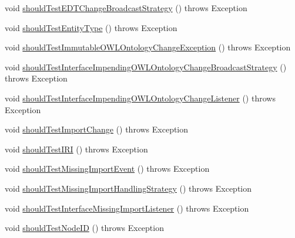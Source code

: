 \begin{DoxyCompactItemize}
\item 
void \hyperlink{classorg_1_1semanticweb_1_1owlapi_1_1contract_1_1_contract_owlapi_model__1_test_a3251e81d8c436be75692f88371d28574}{should\-Test\-E\-D\-T\-Change\-Broadcast\-Strategy} ()  throws Exception 
\item 
void \hyperlink{classorg_1_1semanticweb_1_1owlapi_1_1contract_1_1_contract_owlapi_model__1_test_a2e688bcd1bc9d41d6c4197ff668fec1c}{should\-Test\-Entity\-Type} ()  throws Exception 
\item 
void \hyperlink{classorg_1_1semanticweb_1_1owlapi_1_1contract_1_1_contract_owlapi_model__1_test_a394ca5247b9119881415916f03411073}{should\-Test\-Immutable\-O\-W\-L\-Ontology\-Change\-Exception} ()  throws Exception 
\item 
void \hyperlink{classorg_1_1semanticweb_1_1owlapi_1_1contract_1_1_contract_owlapi_model__1_test_ada18476511b114baf12f73277ff27a08}{should\-Test\-Interface\-Impending\-O\-W\-L\-Ontology\-Change\-Broadcast\-Strategy} ()  throws Exception 
\item 
void \hyperlink{classorg_1_1semanticweb_1_1owlapi_1_1contract_1_1_contract_owlapi_model__1_test_ab635f3392c0b8990fd72c69d79c8362c}{should\-Test\-Interface\-Impending\-O\-W\-L\-Ontology\-Change\-Listener} ()  throws Exception 
\item 
void \hyperlink{classorg_1_1semanticweb_1_1owlapi_1_1contract_1_1_contract_owlapi_model__1_test_a586be624a3d43a2341dcb76300b5d0e6}{should\-Test\-Import\-Change} ()  throws Exception 
\item 
void \hyperlink{classorg_1_1semanticweb_1_1owlapi_1_1contract_1_1_contract_owlapi_model__1_test_a5037375eaf83bda3e71f6c4ef8f58a7b}{should\-Test\-I\-R\-I} ()  throws Exception 
\item 
void \hyperlink{classorg_1_1semanticweb_1_1owlapi_1_1contract_1_1_contract_owlapi_model__1_test_a62452f2f18d98826eb306f7fd7ea0a18}{should\-Test\-Missing\-Import\-Event} ()  throws Exception 
\item 
void \hyperlink{classorg_1_1semanticweb_1_1owlapi_1_1contract_1_1_contract_owlapi_model__1_test_a08a60affe3b33c1b51aedd62e2a78e93}{should\-Test\-Missing\-Import\-Handling\-Strategy} ()  throws Exception 
\item 
void \hyperlink{classorg_1_1semanticweb_1_1owlapi_1_1contract_1_1_contract_owlapi_model__1_test_a79ad488ba1bc4204be9ee69b84b52363}{should\-Test\-Interface\-Missing\-Import\-Listener} ()  throws Exception 
\item 
void \hyperlink{classorg_1_1semanticweb_1_1owlapi_1_1contract_1_1_contract_owlapi_model__1_test_a458c8873695034045bbb1753110fa57a}{should\-Test\-Node\-I\-D} ()  throws Exception 

\end{DoxyCompactItemize}

